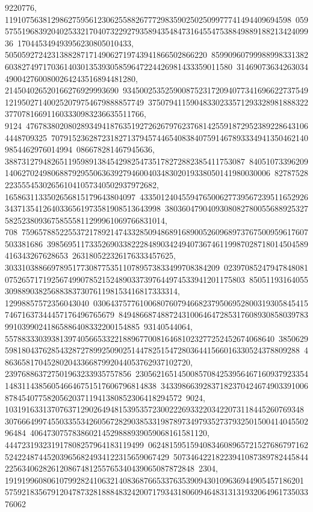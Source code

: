 {{{9220776, 11910756381298627595612306255882677729835902502509977741494409694598\
05957551968392040253321704073229279358943548473164554753884988918821342409936\
170445349493956230805010433, 505059272423138828717149062719743941866502866220\
85990960799988998331382603827497170361403013539305859647224426981433359011580\
314690736342630344900427600800264243516894481280, 214504026520166276929993690\
93450025352590087523172094077341696622737549121950271400252079754679888857749\
37507941159048330233571293328981888322377078166911603330983236635511766, 9124\
47678380208028934941876351927262679762376814255918729523892286431064448709325\
70791523628723182713794574465408384075914678933349413504621409854462976014994\
086678281467945636, 388731279482651195989138454298254735178272882385411753087\
84051073396209140627024980688792955063639279460040348302019338050141980030006\
82787528223555453026561041057340502937972682, 1658631133502656815179643804097\
43350124045594765006277395672395116529263437135412640336561973581908513643998\
380360479040930808278005568892532758252380936758555811299961069766831014, 708\
75965788522553721789214743328509486891689005260968973767500959617607503381686\
39856951173352690338222848903424940736746119987028718014504589416343267628653\
263180522326176333457625, 303310388669789517730877535110789573833499708384209\
02397085247947848081075265717192567499078521524890337397644974533941201175803\
8505119316405530988903825688383730761198153416817333314, 12998857572356043040\
03064375776100680760794668237950695280031930584541574671637344457176496765679\
84948668748872431006464728531760893085803978399103990241865886408332200154885\
93140544064, 5578833303938139740566533221889677008164681023277252452674068640\
38506295981804376285432872789925090251447825154728036441566016330524378809288\
486365817045280204336687992044053762937102720, 239768863727501963233935757856\
23056216514500857084253956467160937923354148311438560546646751517606796814838\
34339866392837182370424674903391006878454077582056203711941380852306418294572\
9024, 10319163313707637129026494815395357230022269332203422073118445260769348\
30766649974550335534260567282903853319878973497935273793250150041404550296484\
406473075783860214529888939059068161581120, 444723193231917808257964183119499\
06248159515940834608965721527686797162524224874452039656824934122315659067429\
50734642218223941087389782445844225634062826120867481255765340439065087872848\
2304, 19191996080610799282410632140836876653376353909430109636944905457186201\
57592183567912047873281888483242007179343180609464831313193206496173503376062\
}}}
